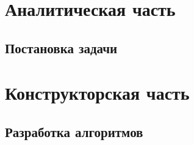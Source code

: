 \documentclass{bmstu}
\begin{document}
\chapter{Аналитическая часть}

\section{Постановка задачи}




\chapter{Конструкторская часть}

\section{Разработка алгоритмов}
%
\end{document}
